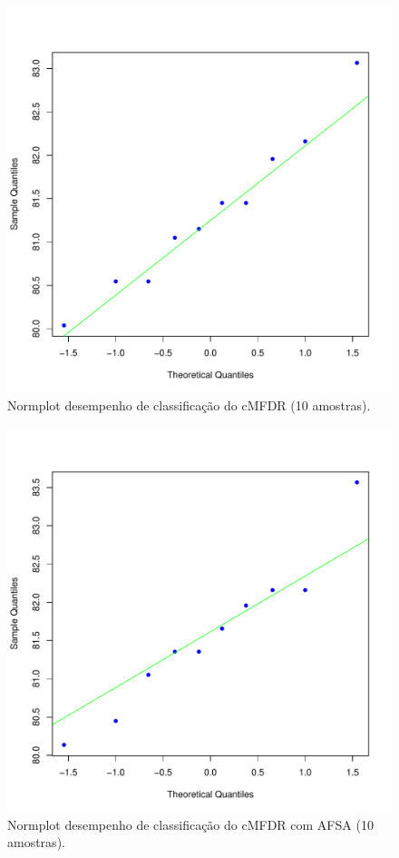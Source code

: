\documentclass[conference]{IEEEtran}
\begin{document}
\begin{figure}[h]
	\centering
	\includegraphics[width=\linewidth]{img/bluenorm_cmfdr.pdf}
	\caption{Normplot desempenho de classificação do cMFDR (10 amostras).}
	\label{fig:norm_cmfdr}
\end{figure}

\begin{figure}[h]
	\centering
	\includegraphics[width=\linewidth]{img/bluenorm_afsa_cmfdr.pdf}
	\caption{Normplot desempenho de classificação do cMFDR com AFSA (10 amostras).}
	\label{fig:norm_afsa_cmfdr}
\end{figure}
\end{document}
